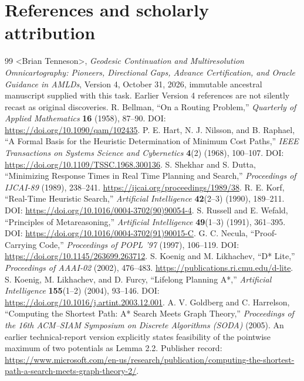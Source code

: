 \documentclass[11pt]{article}
\theoremstyle{definition}\newtheorem{definition}[theorem]{Definition}\newtheorem{assumption}[theorem]{Assumption}
\theoremstyle{remark}\newtheorem{remark}[theorem]{Remark}
\begin{document}
\section*{References and scholarly attribution}
\begin{thebibliography}{99}\small
{} \textless{}Brian Tenneson\textgreater{}, \emph{Geodesic Continuation and Multiresolution Omnicartography: Pioneers, Directional Gaps, Advance Certification, and Oracle Guidance in AMLDs}, Version 4, October 31, 2026, immutable ancestral manuscript supplied with this task. Earlier Version 4 references are not silently recast as original discoveries.
 R. Bellman, ``On a Routing Problem,'' \emph{Quarterly of Applied Mathematics} \textbf{16} (1958), 87--90. DOI: \url{https://doi.org/10.1090/qam/102435}.
 P. E. Hart, N. J. Nilsson, and B. Raphael, ``A Formal Basis for the Heuristic Determination of Minimum Cost Paths,'' \emph{IEEE Transactions on Systems Science and Cybernetics} \textbf{4}(2) (1968), 100--107. DOI: \url{https://doi.org/10.1109/TSSC.1968.300136}.
 S. Shekhar and S. Dutta, ``Minimizing Response Times in Real Time Planning and Search,'' \emph{Proceedings of IJCAI-89} (1989), 238--241. \url{https://ijcai.org/proceedings/1989/38}.
 R. E. Korf, ``Real-Time Heuristic Search,'' \emph{Artificial Intelligence} \textbf{42}(2--3) (1990), 189--211. DOI: \url{https://doi.org/10.1016/0004-3702(90)90054-4}.
 S. Russell and E. Wefald, ``Principles of Metareasoning,'' \emph{Artificial Intelligence} \textbf{49}(1--3) (1991), 361--395. DOI: \url{https://doi.org/10.1016/0004-3702(91)90015-C}.
 G. C. Necula, ``Proof-Carrying Code,'' \emph{Proceedings of POPL '97} (1997), 106--119. DOI: \url{https://doi.org/10.1145/263699.263712}.
 S. Koenig and M. Likhachev, ``D* Lite,'' \emph{Proceedings of AAAI-02} (2002), 476--483. \url{https://publications.ri.cmu.edu/d-lite}.
 S. Koenig, M. Likhachev, and D. Furcy, ``Lifelong Planning A*,'' \emph{Artificial Intelligence} \textbf{155}(1--2) (2004), 93--146. DOI: \url{https://doi.org/10.1016/j.artint.2003.12.001}.
 A. V. Goldberg and C. Harrelson, ``Computing the Shortest Path: A* Search Meets Graph Theory,'' \emph{Proceedings of the 16th ACM--SIAM Symposium on Discrete Algorithms (SODA)} (2005). An earlier technical-report version explicitly states feasibility of the pointwise maximum of two potentials as Lemma 2.2. Publisher record: \url{https://www.microsoft.com/en-us/research/publication/computing-the-shortest-path-a-search-meets-graph-theory-2/}.
\end{thebibliography}
\end{document}
